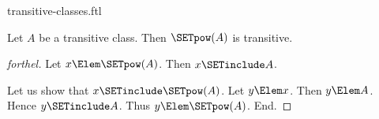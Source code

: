 \documentclass{stex}
\begin{document}
\begin{smodule}{transitive-classes.ftl}
\begin{proposition}[forthel,id=SET_THEORY_01_6995689103949824]
  Let $A$ be a transitive class.
  Then $\SETpow(A)$ is transitive.
\end{proposition}
\begin{proof}[forthel]
  Let $x \Elem \SETpow(A)$.
  Then $x \SETinclude A$.

  Let us show that $x \SETinclude \SETpow(A)$.
    Let $y \Elem x$.
    Then $y \Elem A$.
    Hence $y \SETinclude A$.
    Thus $y \Elem \SETpow(A)$.
  End.
\end{proof}
\end{smodule}
\end{document}
